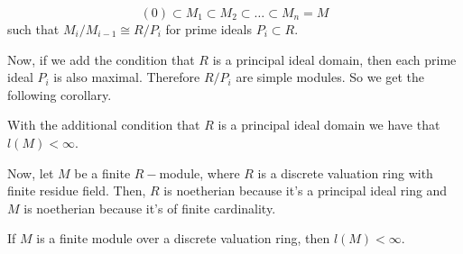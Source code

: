 \begin{equation}
    (0)\subset M_1\subset M_2\subset \dots\subset M_n= M
\end{equation}
such that $M_i/M_{i-1}\cong R/P_i$ for prime ideals $P_i\subset R$.
\par
Now, if we add the condition that $R$ is a principal ideal domain, then each prime ideal $P_i$ is also maximal. Therefore $R/P_i$ are simple modules. So we get the following corollary.
\begin{dang}
    \begin{corollary}\label{a_finite_module_over_aDVR_have_finite_lenght}
        With the additional condition that $R$ is a principal ideal domain we have that $l(M)<\infty$.
    \end{corollary}
\end{dang}
Now, let $M$ be a finite $R-$module, where $R$ is a discrete valuation ring with finite residue field. Then, $R$ is noetherian because it's a principal ideal ring and $M$ is noetherian because it's of finite cardinality. 
\begin{dang}
    \begin{corollary}\label{finite_o_modules_have_finite_composition_series}
        If $M$ is a finite module over a discrete valuation ring, then $l(M)<\infty$.
    \end{corollary}
\end{dang}

